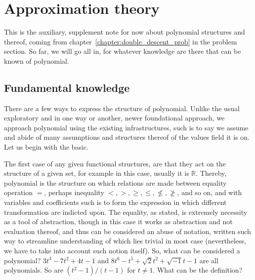 \chapter{Approximation theory}
This is the auxiliary, supplement note for now about polynomial structures and thereof, coming from chapter~\ref{chapter:double_descent_prob} in the problem section. So far, we will go all in, for whatever knowledge are there that can be known of polynomial. 
\section{Fundamental knowledge}

There are a few ways to express the structure of polynomial. Unlike the usual exploratory and in one way or another, newer foundational approach, we approach polynomial using the existing infrastructures, such is to say we assume and abide of many assumptions and structures thereof of the values field it is on. Let us begin with the basic. 

The first case of any given functional structures, are that they act on the structure of a given set, for example in this case, usually it is $\mathbb{R}$. Thereby, polynomial is the structure on which relations are made between equality operation $=$, perhaps inequality $<,>,\geq,\leq,\not\leq,\not\geq$, and so on, and with variables and coefficients such is to form the expression in which different transformation are indicted upon. The equality, as stated, is extremely necessity as a tool of abstraction, though in this case it works as abstraction and not evaluation thereof, and thus can be considered an abuse of notation, written such way to streamline understanding of which lies trivial in most case (nevertheless, we have to take into account such notion itself). So, what can be considered a polynomial? $3t^{3}-7t^{2}+4t-1$ and $8t^{6}-t^{5}+\sqrt{2}t^{2}+\sqrt{-1}t-1$ are all polynomials. So are $(t^{2}-1)/(t-1)$ for $t\neq 1$. What can be the definition? 

